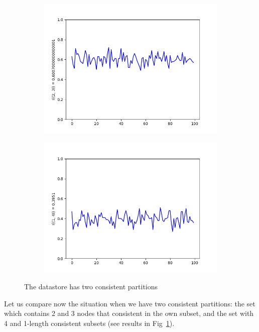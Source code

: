 \documentclass[a4paper,14pt]{llncs}
\begin{document}
\begin{figure}
\begin{subfigure}{0.5\linewidth}
\centering\includegraphics[scale=0.4]{images/2-3-consistent-partitions-probability.png}\hfill
\end{subfigure}
\begin{subfigure}{0.5\linewidth}
\centering\includegraphics[scale=0.4]{images/1-4-consistent-partitions-probability.png}
\end{subfigure}
\caption{The datastore has two consistent partitions}\label{pic:two_parts}
\end{figure}
Let us compare now the situation when we have two consistent partitions: the set which contains 2 and 3 nodes that consistent in the own subset, and the set with 4 and 1-length consistent subsets (see results in Fig~\ref{pic:two_parts}).
\end{document}
